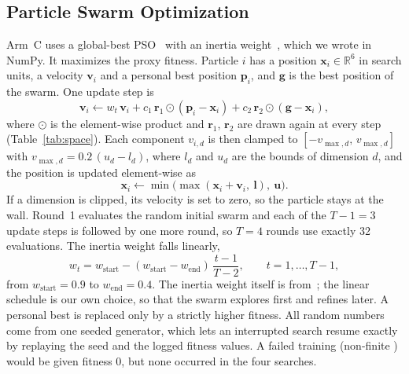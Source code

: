 \subsection{Particle Swarm Optimization}
\label{subsec:pso}

Arm~C uses a global-best PSO~\cite{kennedy1995particle} with an inertia weight~\cite{shi1998modified}, which we wrote in NumPy. It maximizes the proxy fitness. Particle $i$ has a position $\mathbf{x}_i \in \mathbb{R}^6$ in search units, a velocity $\mathbf{v}_i$ and a personal best position $\mathbf{p}_i$, and $\mathbf{g}$ is the best position of the swarm. One update step is
\begin{equation}
\mathbf{v}_i \leftarrow w_t\,\mathbf{v}_i + c_1\,\mathbf{r}_1 \odot (\mathbf{p}_i - \mathbf{x}_i) + c_2\,\mathbf{r}_2 \odot (\mathbf{g} - \mathbf{x}_i),
\label{eq:velocity}
\end{equation}
where $\odot$ is the element-wise product and $\mathbf{r}_1$, $\mathbf{r}_2$ are drawn again at every step (Table~\ref{tab:space}). Each component $v_{i,d}$ is then clamped to $[-v_{\max,d},\, v_{\max,d}]$ with $v_{\max,d} = 0.2\,(u_d - l_d)$, where $l_d$ and $u_d$ are the bounds of dimension $d$, and the position is updated element-wise as
\begin{equation}
\mathbf{x}_i \leftarrow \min\bigl(\max(\mathbf{x}_i + \mathbf{v}_i,\ \mathbf{l}),\ \mathbf{u}\bigr).
\label{eq:position}
\end{equation}
If a dimension is clipped, its velocity is set to zero, so the particle stays at the wall. Round~1 evaluates the random initial swarm and each of the $T-1 = 3$ update steps is followed by one more round, so $T = 4$ rounds use exactly 32 evaluations. The inertia weight falls linearly,
\begin{equation}
w_t = w_{\mathrm{start}} - (w_{\mathrm{start}} - w_{\mathrm{end}})\,\frac{t-1}{T-2}, \qquad t = 1, \dots, T-1,
\label{eq:inertia}
\end{equation}
from $w_{\mathrm{start}} = 0.9$ to $w_{\mathrm{end}} = 0.4$. The inertia weight itself is from~\cite{shi1998modified}; the linear schedule is our own choice, so that the swarm explores first and refines later. A personal best is replaced only by a strictly higher fitness. All random numbers come from one seeded generator, which lets an interrupted search resume exactly by replaying the seed and the logged fitness values. A failed training (non-finite \mapfifty) would be given fitness 0, but none occurred in the four searches.

